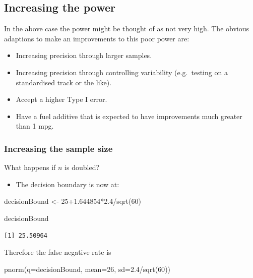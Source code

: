 \documentclass[
  oneside]{krantz}
\newenvironment{Shaded}{\begin{snugshade}}{\end{snugshade}}
\newcommand{\AttributeTok}[1]{\textcolor[rgb]{0.77,0.63,0.00}{#1}}
\newcommand{\DecValTok}[1]{\textcolor[rgb]{0.00,0.00,0.81}{#1}}
\newcommand{\FloatTok}[1]{\textcolor[rgb]{0.00,0.00,0.81}{#1}}
\newcommand{\FunctionTok}[1]{\textcolor[rgb]{0.00,0.00,0.00}{#1}}
\newcommand{\NormalTok}[1]{#1}
\newcommand{\OtherTok}[1]{\textcolor[rgb]{0.56,0.35,0.01}{#1}}
\newcommand{\SpecialCharTok}[1]{\textcolor[rgb]{0.00,0.00,0.00}{#1}}
\providecommand{\tightlist}{%
  \setlength{\itemsep}{0pt}\setlength{\parskip}{0pt}}
\begin{document}
\hypertarget{increasing-the-power}{%
\subsection{Increasing the power}\label{increasing-the-power}}

In the above case the power might be thought of as not very high. The obvious adaptions to make an improvements to this poor power are:

\begin{itemize}
\tightlist
\item
  Increasing precision through larger samples.
\item
  Increasing precision through controlling variability (e.g.~testing on a standardised track or the like).
\item
  Accept a higher Type I error.
\item
  Have a fuel additive that is expected to have improvements much greater than 1 mpg.
\end{itemize}

\hypertarget{increasing-the-sample-size}{%
\subsubsection{Increasing the sample size}\label{increasing-the-sample-size}}

What happens if \(n\) is doubled?

\begin{itemize}
\tightlist
\item
  The decision boundary is now at:
\end{itemize}

\begin{Shaded}
\begin{Highlighting}[]
\NormalTok{decisionBound }\OtherTok{\textless{}{-}} \DecValTok{25}\FloatTok{+1.644854}\SpecialCharTok{*}\FloatTok{2.4}\SpecialCharTok{/}\FunctionTok{sqrt}\NormalTok{(}\DecValTok{60}\NormalTok{)}

\NormalTok{decisionBound}
\end{Highlighting}
\end{Shaded}

\begin{verbatim}
[1] 25.50964
\end{verbatim}

Therefore the false negative rate is

\begin{Shaded}
\begin{Highlighting}[]
\FunctionTok{pnorm}\NormalTok{(}\AttributeTok{q=}\NormalTok{decisionBound, }\AttributeTok{mean=}\DecValTok{26}\NormalTok{, }\AttributeTok{sd=}\FloatTok{2.4}\SpecialCharTok{/}\FunctionTok{sqrt}\NormalTok{(}\DecValTok{60}\NormalTok{))}
\end{Highlighting}
\end{Shaded}
\end{document}
